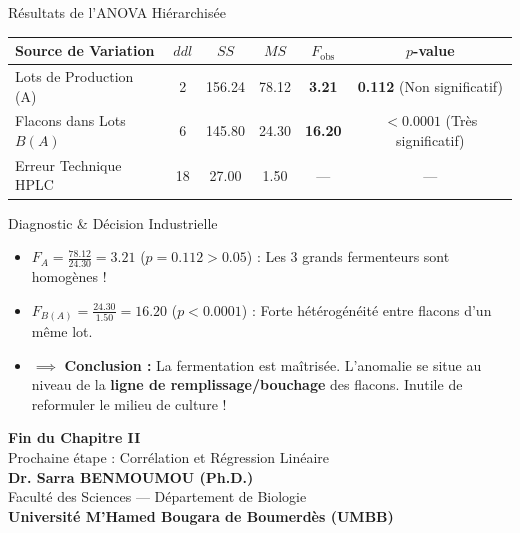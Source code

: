 \documentclass[aspectratio=169,10pt]{beamer}
\begin{document}
\begin{frame}{Résultats de l'ANOVA Hiérarchisée}
  \begin{table}[h]
    \centering
    \small
    \begin{tabular}{lccccc}
      \toprule
      \textbf{Source de Variation} & \textbf{$ddl$} & \textbf{$SS$} & \textbf{$MS$} & \textbf{$F_{\text{obs}}$} & \textbf{$p$-value} \\
      \midrule
      Lots de Production (A) & 2 & 156.24 & 78.12 & \textbf{3.21} & \textbf{0.112} (Non significatif) \\
      Flacons dans Lots $B(A)$ & 6 & 145.80 & 24.30 & \textbf{16.20} & \textbf{$< 0.0001$} (Très significatif) \\
      Erreur Technique HPLC & 18 & 27.00 & 1.50 & --- & --- \\
      \bottomrule
    \end{tabular}
  \end{table}

  \begin{takeawaybox}{Diagnostic \& Décision Industrielle}
    \begin{itemize}
      \item $F_A = \frac{78.12}{24.30} = 3.21$ ($p = 0.112 > 0.05$) : Les 3 grands fermenteurs sont homogènes !
      \item $F_{B(A)} = \frac{24.30}{1.50} = 16.20$ ($p < 0.0001$) : Forte hétérogénéité entre flacons d'un même lot.
      \item $\implies$ \textbf{Conclusion :} La fermentation est maîtrisée. L'anomalie se situe au niveau de la \textbf{ligne de remplissage/bouchage} des flacons. Inutile de reformuler le milieu de culture !
    \end{itemize}
  \end{takeawaybox}
\end{frame}

\begin{frame}[plain]
  \begin{center}
    \vspace{1.8cm}
    {\Huge\color{BioNavy}\textbf{Fin du Chapitre II}}\\[0.8cm]
    {\large Prochaine étape : Corrélation et Régression Linéaire}\\[1.2cm]
    \textbf{Dr. Sarra BENMOUMOU (Ph.D.)}\\
    \small Faculté des Sciences --- Département de Biologie\\
    \textbf{Université M'Hamed Bougara de Boumerdès (UMBB)}
  \end{center}
\end{frame}
\end{document}
